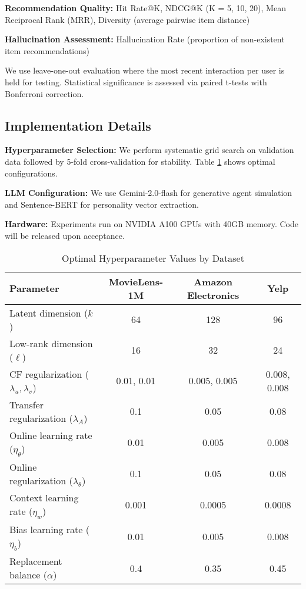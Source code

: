 \documentclass[acmsmall]{acmart}
\begin{document}
\textbf{Recommendation Quality:} Hit Rate@K, NDCG@K (K = 5, 10, 20), Mean Reciprocal Rank (MRR), Diversity (average pairwise item distance)

\textbf{Hallucination Assessment:} Hallucination Rate (proportion of non-existent item recommendations)

We use leave-one-out evaluation where the most recent interaction per user is held for testing. Statistical significance is assessed via paired t-tests with Bonferroni correction.

\subsection{Implementation Details}
\textbf{Hyperparameter Selection:} We perform systematic grid search on validation data followed by 5-fold cross-validation for stability. Table \ref{tab:hyperparams} shows optimal configurations.

\textbf{LLM Configuration:} We use Gemini-2.0-flash for generative agent simulation and Sentence-BERT for personality vector extraction.

\textbf{Hardware:} Experiments run on NVIDIA A100 GPUs with 40GB memory. Code will be released upon acceptance.

\begin{table}[h]
\centering
\caption{Optimal Hyperparameter Values by Dataset}
\label{tab:hyperparams}
\small
\begin{tabular}{lccc}
\toprule
\textbf{Parameter} & \textbf{MovieLens-1M} & \textbf{Amazon Electronics} & \textbf{Yelp} \\
\midrule
Latent dimension ($k$) & 64 & 128 & 96 \\
Low-rank dimension ($\ell$) & 16 & 32 & 24 \\
CF regularization ($\lambda_u, \lambda_v$) & 0.01, 0.01 & 0.005, 0.005 & 0.008, 0.008 \\
Transfer regularization ($\lambda_A$) & 0.1 & 0.05 & 0.08 \\
Online learning rate ($\eta_\theta$) & 0.01 & 0.005 & 0.008 \\
Online regularization ($\lambda_\theta$) & 0.1 & 0.05 & 0.08 \\
Context learning rate ($\eta_w$) & 0.001 & 0.0005 & 0.0008 \\
Bias learning rate ($\eta_b$) & 0.01 & 0.005 & 0.008 \\
Replacement balance ($\alpha$) & 0.4 & 0.35 & 0.45 \\
\bottomrule
\end{tabular}
\end{table}
\end{document}
